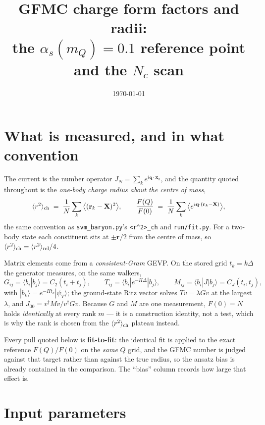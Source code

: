 \documentclass[11pt]{article}
\title{GFMC charge form factors and radii:\\
       the $\alpha_s(m_Q)=0.1$ reference point and the $N_c$ scan}
\author{}
\date{\today}
\newcommand{\rch}{\langle r^2\rangle_{\rm ch}}
\newcommand{\code}[1]{\texttt{\small #1}}
\begin{document}
\maketitle

\section{What is measured, and in what convention}

The current is the number operator $J_N=\sum_k e^{i\mathbf q\cdot\mathbf x_k}$, and the
quantity quoted throughout is the \emph{one-body charge radius about the centre of mass},
\begin{equation}
  \rch \;=\; \frac1N\sum_k \big\langle (\mathbf r_k-\mathbf X)^2\big\rangle ,
  \qquad
  \frac{F(Q)}{F(0)} \;=\; \frac1N\sum_k \big\langle e^{i\mathbf q\cdot(\mathbf r_k-\mathbf X)}
  \big\rangle ,
\end{equation}
the same convention as \code{svm\_baryon.py}'s \code{<r\^{}2>\_ch} and \code{run/fit.py}.  For
a two-body state each constituent sits at $\pm\mathbf r/2$ from the centre of mass, so
$\rch=\langle r^2\rangle_{\rm rel}/4$.

Matrix elements come from a \emph{consistent-Gram} GEVP.  On the stored grid $t_k=k\Delta$ the
generator measures, on the same walkers,
\begin{equation}
  G_{ij}=\langle b_i|b_j\rangle = C_2(t_i+t_j),\qquad
  T_{ij}=\langle b_i|e^{-H\Delta}|b_j\rangle,\qquad
  M_{ij}=\langle b_i|J|b_j\rangle = C_J(t_i,t_j),
\end{equation}
with $|b_k\rangle=e^{-Ht_k}|\psi_T\rangle$; the ground-state Ritz vector solves
$Tv=\lambda Gv$ at the largest $\lambda$, and $J_{00}=v^\dagger Mv/v^\dagger Gv$.  Because $G$
and $M$ are one measurement, $F(0)=N$ holds \emph{identically} at every rank $m$ --- it is a
construction identity, not a test, which is why the rank is chosen from the $\rch$ plateau
instead.

Every pull quoted below is \textbf{fit-to-fit}: the identical fit is applied to the exact
reference $F(Q)/F(0)$ on the \emph{same} $Q$ grid, and the GFMC number is judged against that
target rather than against the true radius, so the ansatz bias is already contained in the
comparison.  The ``bias'' column records how large that effect is.

\section{Input parameters}
\end{document}
